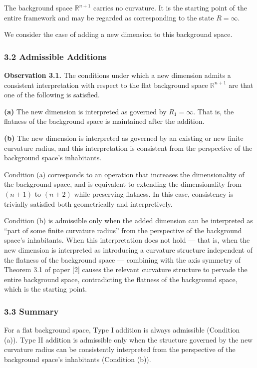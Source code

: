 \documentclass[a4paper,11pt]{article}
\theoremstyle{definition}
\begin{document}
The background space \(\mathbb{R}^{n+1}\) carries no curvature. It is the starting point of the entire framework and may be regarded as corresponding to the state \(R = \infty\).

We consider the case of adding a new dimension to this background space.

\subsubsection{3.2 Admissible Additions}\label{admissible-additions}

\textbf{Observation 3.1.} The conditions under which a new dimension admits a consistent interpretation with respect to the flat background space \(\mathbb{R}^{n+1}\) are that one of the following is satisfied.

\textbf{(a)} The new dimension is interpreted as governed by \(R_1 = \infty\). That is, the flatness of the background space is maintained after the addition.

\textbf{(b)} The new dimension is interpreted as governed by an existing or new finite curvature radius, and this interpretation is consistent from the perspective of the background space's inhabitants.

Condition (a) corresponds to an operation that increases the dimensionality of the background space, and is equivalent to extending the dimensionality from \((n+1)\) to \((n+2)\) while preserving flatness. In this case, consistency is trivially satisfied both geometrically and interpretively.

Condition (b) is admissible only when the added dimension can be interpreted as ``part of some finite curvature radius'' from the perspective of the background space's inhabitants. When this interpretation does not hold --- that is, when the new dimension is interpreted as introducing a curvature structure independent of the flatness of the background space --- combining with the axis symmetry of Theorem 3.1 of paper {[}2{]} causes the relevant curvature structure to pervade the entire background space, contradicting the flatness of the background space, which is the starting point.

\subsubsection{3.3 Summary}\label{summary}

For a flat background space, Type I addition is always admissible (Condition (a)). Type II addition is admissible only when the structure governed by the new curvature radius can be consistently interpreted from the perspective of the background space's inhabitants (Condition (b)).
\end{document}
